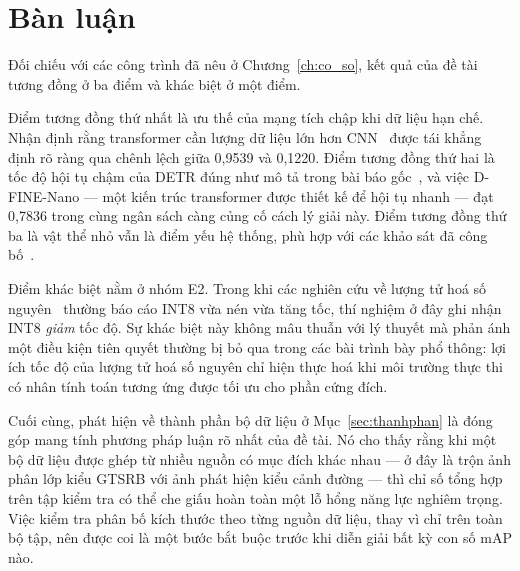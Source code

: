 \section{Bàn luận}

Đối chiếu với các công trình đã nêu ở Chương~\ref{ch:co_so}, kết quả của đề tài tương đồng ở ba
điểm và khác biệt ở một điểm.

Điểm tương đồng thứ nhất là ưu thế của mạng tích chập khi dữ liệu hạn chế. Nhận định rằng
transformer cần lượng dữ liệu lớn hơn CNN~\cite{dosovitskiy2021vit} được tái khẳng định rõ ràng
qua chênh lệch giữa 0,9539 và 0,1220. Điểm tương đồng thứ hai là tốc độ hội tụ chậm của DETR đúng
như mô tả trong bài báo gốc~\cite{carion2020detr}, và việc D-FINE-Nano --- một kiến trúc
transformer được thiết kế để hội tụ nhanh --- đạt 0,7836 trong cùng ngân sách càng củng cố cách lý
giải này. Điểm tương đồng thứ ba là vật thể nhỏ vẫn là điểm yếu hệ thống, phù hợp với các khảo sát
đã công bố~\cite{tong2020smallobject}.

Điểm khác biệt nằm ở nhóm E2. Trong khi các nghiên cứu về lượng tử hoá số
nguyên~\cite{jacob2018quantization} thường báo cáo INT8 vừa nén vừa tăng tốc, thí nghiệm ở đây ghi
nhận INT8 \emph{giảm} tốc độ. Sự khác biệt này không mâu thuẫn với lý thuyết mà phản ánh một điều
kiện tiên quyết thường bị bỏ qua trong các bài trình bày phổ thông: lợi ích tốc độ của lượng tử
hoá số nguyên chỉ hiện thực hoá khi môi trường thực thi có nhân tính toán tương ứng được tối ưu
cho phần cứng đích.

Cuối cùng, phát hiện về thành phần bộ dữ liệu ở Mục~\ref{sec:thanhphan} là đóng góp mang tính
phương pháp luận rõ nhất của đề tài. Nó cho thấy rằng khi một bộ dữ liệu được ghép từ nhiều nguồn
có mục đích khác nhau --- ở đây là trộn ảnh phân lớp kiểu GTSRB với ảnh phát hiện kiểu cảnh đường
--- thì chỉ số tổng hợp trên tập kiểm tra có thể che giấu hoàn toàn một lỗ hổng năng lực nghiêm
trọng. Việc kiểm tra phân bố kích thước theo từng nguồn dữ liệu, thay vì chỉ trên toàn bộ tập, nên
được coi là một bước bắt buộc trước khi diễn giải bất kỳ con số mAP nào.
